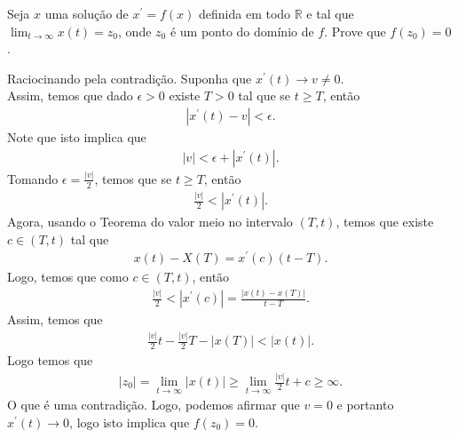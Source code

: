 \begin{homeworkProblem}[1-7]
  Seja $x$ uma solução de $x^{\prime}= f(x)$ definida em todo $\mathbb{R}$ e tal que $\lim_{t\to\infty} x(t) = z_0$, onde $z_0$ é um ponto do domínio de $f$. Prove que $f(z_0) = 0$.
  \begin{solution}
    Raciocinando pela contradição. Suponha que $x^{\prime}(t)\to v\neq 0$.\\
    Assim, temos que dado $\epsilon>0$ existe $T>0$ tal que se $t\geq T$, então
    \begin{align*}
      |x^{\prime}(t)-v|<\epsilon.
    \end{align*}
    Note que isto implica que
    \begin{align*}
      |v|<\epsilon +|x^{\prime}(t)|.
    \end{align*}
    Tomando $\epsilon=\frac{|v|}{2}$, temos que se $t\geq T$, então
    \begin{align*}
      \frac{|v|}{2}< |x^{\prime}(t)|. 
    \end{align*}
    Agora, usando o Teorema do valor meio no intervalo $(T,t)$, temos que existe $c\in (T,t)$ tal que
    \begin{align*}
      x(t)-X(T)=x^{\prime}(c)(t-T).
    \end{align*}
    Logo, temos que como $c\in (T,t)$, então
    \begin{align*}
      \frac{|v|}{2}<|x^{\prime}(c)|=\frac{|x(t)-x(T)|}{t-T}.  
    \end{align*}
    Assim, temos que
    \begin{align*}
      \frac{|v|}{2}t-\frac{|v|}{2}T-|x(T)|<|x(t)|.
    \end{align*}
    Logo temos que
    \begin{align*}
      |z_0|=\lim_{t \to \infty}|x(t)|\geq \lim_{t \to \infty}\frac{|v|}{2}t + c \geq \infty.
    \end{align*}
    O que é uma contradição. Logo, podemos afirmar que $v=0$ e portanto $x^{\prime}(t)\to 0$, logo isto implica que $f(z_0)=0$. 
  \end{solution}
\end{homeworkProblem}
